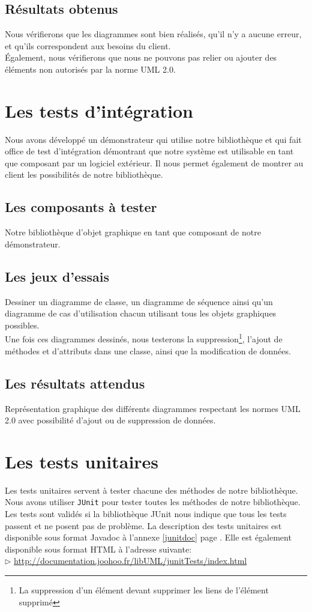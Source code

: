 \documentclass[12pt,a4paper,openany]{report}
\begin{document}
		\subsection{Résultats obtenus}
		Nous vérifierons que les diagrammes sont bien réalisés, qu'il n'y a aucune erreur, et qu'ils correspondent aux besoins du client.\\
		Également, nous vérifierons que nous ne pouvons pas relier ou ajouter des éléments non autorisés par la norme UML 2.0.

	\section{Les tests d'intégration}
		Nous avons développé un démonstrateur qui utilise notre bibliothèque et qui fait office de test d'intégration démontrant que notre système
		est utilisable en tant que composant par un logiciel extérieur. Il nous permet également de montrer au client les possibilités de notre bibliothèque.

		\subsection{Les composants à tester}
			Notre bibliothèque d'objet graphique en tant que composant de notre démonstrateur.

			\subsection{Les jeux d'essais}
			Dessiner un diagramme de classe, un diagramme de séquence ainsi qu'un diagramme de cas d'utilisation chacun utilisant tous les objets graphiques 
			possibles. \\
			Une fois ces diagrammes dessinés, nous testerons la suppression\footnote{La suppression d'un élément devant supprimer les liens de l'élément supprimé},
			l'ajout de méthodes et d'attributs dans une classe, ainsi que la modification de données.

			\subsection{Les résultats attendus}
			Représentation graphique des différents diagrammes respectant les normes UML 2.0 avec possibilité d'ajout ou de suppression de données.
			\newpage
	\section{Les tests unitaires}
	Les tests unitaires servent à tester chacune des méthodes de notre bibliothèque.\\
	Nous avons utiliser \texttt{JUnit} pour tester toutes les méthodes de notre bibliothèque. Les tests sont validés si 
	la bibliothèque JUnit nous indique que tous les tests passent et ne posent pas de problème.
	La description des tests unitaires est disponible sous format Javadoc à l'annexe \ref{junitdoc} page \pageref{junitdoc}.
	Elle est également disponible sous format HTML à l'adresse suivante: \\
	$\rhd$ \url{http://documentation.joohoo.fr/libUML/junitTests/index.html}\\
		
\end{document}
